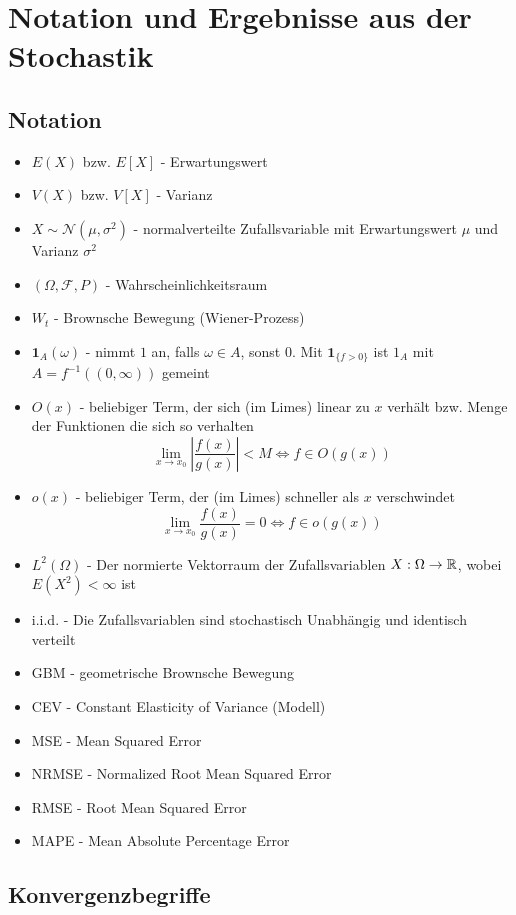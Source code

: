 \section{Notation und Ergebnisse aus der Stochastik}
\subsection{Notation}
\begin{itemize}
    \item $E(X)$ bzw. $E[X]$ - Erwartungswert
    \item $V(X)$ bzw. $V[X]$ - Varianz
    \item $X \sim \mathcal N(\mu, \sigma^2)$ - normalverteilte Zufallsvariable mit Erwartungswert $\mu$ und Varianz $\sigma^2$
    \item $(\Omega, \mathcal F, P)$ - Wahrscheinlichkeitsraum
    \item $W_t$ - Brownsche Bewegung (Wiener-Prozess)
    \item $\mathbf 1_A(\omega)$ - nimmt $1$ an, falls $\omega \in A$, sonst $0$. Mit $\mathbf 1_{\{f \gt 0\}}$ ist $1_A$ mit $A=f^{-1}((0, \infty))$ gemeint
    \item $O(x)$ - beliebiger Term, der sich (im Limes) linear zu $x$ verhält bzw. Menge der Funktionen die sich so verhalten
$$\lim_{x \to x_0} \left \vert \frac{f(x)}{g(x)} \right \vert  \lt M \iff f \in O(g(x))$$    
    \item $o(x)$ - beliebiger Term, der (im Limes) schneller als $x$ verschwindet
$$\lim_{x \to x_0} \frac{f(x)}{g(x)} = 0 \iff f \in o(g(x))$$    
    \item $L^2(\Omega)$ - Der normierte Vektorraum der Zufallsvariablen $X : \Omega \to \Bbb R$, wobei $E(X^2) \lt \infty$ ist
    \item i.i.d. - Die Zufallsvariablen sind stochastisch Unabhängig und identisch verteilt
    \item GBM - geometrische Brownsche Bewegung
    \item CEV - Constant Elasticity of Variance (Modell)
    \item MSE - Mean Squared Error
    \item NRMSE - Normalized Root Mean Squared Error
    \item RMSE - Root Mean Squared Error
    \item MAPE - Mean Absolute Percentage Error
\end{itemize}

\subsection{Konvergenzbegriffe}

